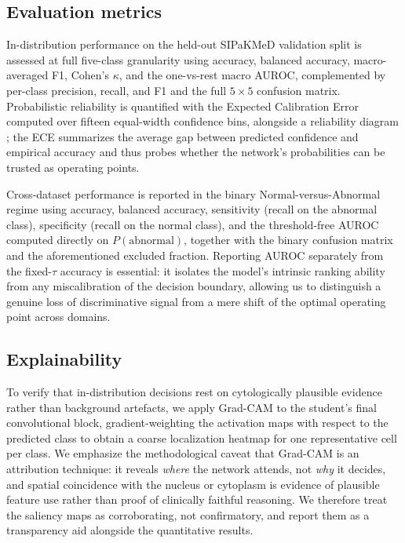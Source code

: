 \documentclass[twocolumn]{article}
\begin{document}
\subsection{Evaluation metrics}

In-distribution performance on the held-out SIPaKMeD validation split is assessed at full five-class granularity using accuracy, balanced accuracy, macro-averaged F1, Cohen's $\kappa$, and the one-vs-rest macro AUROC, complemented by per-class precision, recall, and F1 and the full $5\times5$ confusion matrix. Probabilistic reliability is quantified with the Expected Calibration Error computed over fifteen equal-width confidence bins, alongside a reliability diagram \citep{guo2017calibration}; the ECE summarizes the average gap between predicted confidence and empirical accuracy and thus probes whether the network's probabilities can be trusted as operating points.

Cross-dataset performance is reported in the binary Normal-versus-Abnormal regime using accuracy, balanced accuracy, sensitivity (recall on the abnormal class), specificity (recall on the normal class), and the threshold-free AUROC computed directly on $P(\text{abnormal})$, together with the binary confusion matrix and the aforementioned excluded fraction. Reporting AUROC separately from the fixed-$\tau$ accuracy is essential: it isolates the model's intrinsic ranking ability from any miscalibration of the decision boundary, allowing us to distinguish a genuine loss of discriminative signal from a mere shift of the optimal operating point across domains.

\subsection{Explainability}

To verify that in-distribution decisions rest on cytologically plausible evidence rather than background artefacts, we apply Grad-CAM \citep{selvaraju2017gradcam} to the student's final convolutional block, gradient-weighting the activation maps with respect to the predicted class to obtain a coarse localization heatmap for one representative cell per class. We emphasize the methodological caveat that Grad-CAM is an attribution technique: it reveals \emph{where} the network attends, not \emph{why} it decides, and spatial coincidence with the nucleus or cytoplasm is evidence of plausible feature use rather than proof of clinically faithful reasoning. We therefore treat the saliency maps as corroborating, not confirmatory, and report them as a transparency aid alongside the quantitative results.
\end{document}
